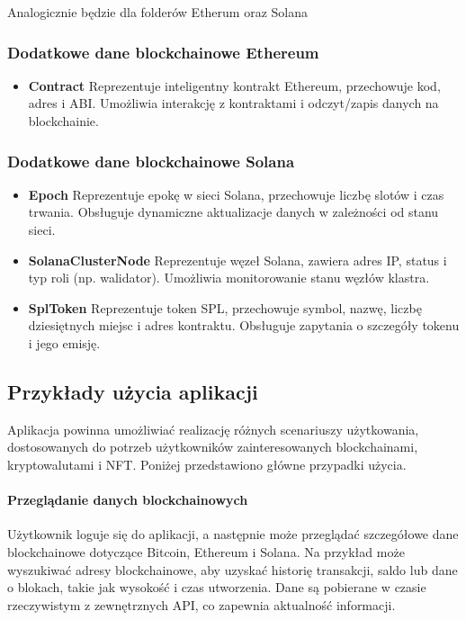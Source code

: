 \begin{itemize}
Analogicznie będzie dla folderów Etherum oraz Solana
\subsubsection{Dodatkowe dane blockchainowe Ethereum}
\begin{itemize}
\item \textbf{Contract} Reprezentuje inteligentny kontrakt Ethereum, przechowuje kod, adres i ABI. Umożliwia interakcję z kontraktami i odczyt/zapis danych na blockchainie.
\end{itemize}

\subsubsection{Dodatkowe dane blockchainowe Solana}
\begin{itemize}
\item \textbf{Epoch} Reprezentuje epokę w sieci Solana, przechowuje liczbę slotów i czas trwania. Obsługuje dynamiczne aktualizacje danych w zależności od stanu sieci.
\item \textbf{SolanaClusterNode} Reprezentuje węzeł Solana, zawiera adres IP, status i typ roli (np. walidator). Umożliwia monitorowanie stanu węzłów klastra.
\item \textbf{SplToken} Reprezentuje token SPL, przechowuje symbol, nazwę, liczbę dziesiętnych miejsc i adres kontraktu. Obsługuje zapytania o szczegóły tokenu i jego emisję.
\end{itemize}

\subsection{Przykłady użycia aplikacji}
Aplikacja powinna umożliwiać realizację różnych scenariuszy użytkowania, dostosowanych do potrzeb użytkowników zainteresowanych blockchainami, kryptowalutami i NFT. Poniżej przedstawiono główne przypadki użycia.

\paragraph{Przeglądanie danych blockchainowych}
Użytkownik loguje się do aplikacji, a następnie może przeglądać szczegółowe dane blockchainowe dotyczące Bitcoin, Ethereum i Solana. Na przykład może wyszukiwać adresy blockchainowe, aby uzyskać historię transakcji, saldo lub dane o blokach, takie jak wysokość i czas utworzenia. Dane są pobierane w czasie rzeczywistym z zewnętrznych API, co zapewnia aktualność informacji.


\end{itemize}
